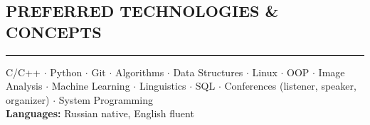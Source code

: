 \documentclass[11pt]{res} %
\begin{document}
\begin{resume}
\section{\uppercase{Preferred technologies \& concepts}}
\begin{spacing}{0.3}
\textcolor[RGB]{220,220,220}{\rule{\linewidth}{0.4pt}} 
\end{spacing}
C/C++ $\cdot$ Python $\cdot$ Git $\cdot$ Algorithms $\cdot$ Data Structures $\cdot$ Linux $\cdot$ OOP $\cdot$ Image Analysis $\cdot$ Machine Learning $\cdot$ Linguistics $\cdot$ SQL $\cdot$ Conferences (listener, speaker, organizer) $\cdot$ System Programming \\
\textbf{Languages:} Russian native, English fluent

\end{resume}
\end{document}
